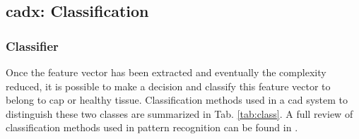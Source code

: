 \subsection{\ac{cadx}: Classification} \label{subsec:classification}

\subsubsection{Classifier}

Once the feature vector has been extracted and eventually the complexity reduced, it is possible to make a decision and classify this feature vector to belong to \ac{cap} or healthy tissue. Classification methods used in a \ac{cad} system to distinguish these two classes are summarized in Tab. \ref{tab:class}. A full review of classification methods used in pattern recognition can be found in \cite{Bishop2006}.

